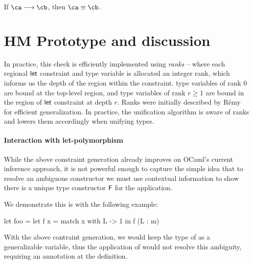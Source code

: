 \documentclass[acmsmall,screen,nonacm]{acmart}
\begin{document}
\begin{theorem}[Preservation]
  If $\ca \csolve \cb$, then $\ca \cequiv \cb$.
\end{theorem}



\section{HM Prototype and discussion}
\label{sec:implementation}


In practice, this
check is efficiently implemented using \emph{ranks} -- where each regional
$\mathopen{}\mathrel{\mathsf{let}}$ constraint and type variable is allocated an integer rank, which
informs us the depth of the region within the constraint. type variables of
rank $0$ are bound at the top-level region, and type variables of rank $r \geq
1$ are bound in the region of $\mathopen{}\mathrel{\mathsf{let}}$ constraint at depth $r$. Ranks were
initially described by R\'emy \cite{TODO} for efficient generalization.
In practice, the unification algorithm is aware of ranks and lowers them
accordingly when unifying types.





\paragraph{Interaction with let-polymorphism}


While the above constraint generation already improves on
OCaml's current inference approach, it is not powerful enough to capture the
simple idea that to resolve an ambiguous constructor we must use contextual
information to show there is a unique type constructor $\mathrel{\mathsf{F}}\mathclose{}$ for the
application.

We demonstrate this is with the following example:
\begin{program}
let foo =
  let f x = match x with L -> 1 in
  f (L : m)
\end{program}
With the above contraint generation, we would keep the type of 
as a generalizable variable, thus the application of  would not
resolve this ambiguity, requiring an annotation at the definition.
\end{document}
